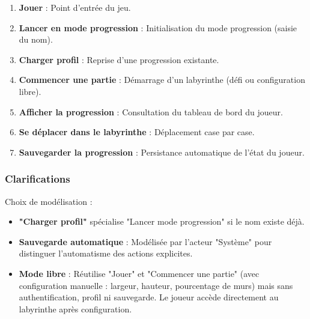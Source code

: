 \documentclass{butexFR}
\begin{document}
\begin{enumerate}
    \item \textbf{Jouer} : Point d'entrée du jeu.
    \item \textbf{Lancer en mode progression} : Initialisation du mode progression (saisie du nom).
    \item \textbf{Charger profil} : Reprise d'une progression existante.
    \item \textbf{Commencer une partie} : Démarrage d'un labyrinthe (défi ou configuration libre).
    \item \textbf{Afficher la progression} : Consultation du tableau de bord du joueur.
    \item \textbf{Se déplacer dans le labyrinthe} : Déplacement case par case.
    \item \textbf{Sauvegarder la progression} : Persistance automatique de l'état du joueur.
\end{enumerate}

\subsubsection{Clarifications}

Choix de modélisation :

\begin{itemize}
    \item \textbf{"Charger profil"} spécialise "Lancer mode progression" si le nom existe déjà.

    \item \textbf{Sauvegarde automatique} : Modélisée par l'acteur "Système" pour distinguer l'automatisme des actions explicites.

    \item \textbf{Mode libre} : Réutilise "Jouer" et "Commencer une partie" (avec configuration manuelle : largeur, hauteur, pourcentage de murs) mais sans authentification, profil ni sauvegarde. Le joueur accède directement au labyrinthe après configuration.
\end{itemize}

\newpage
\end{document}
